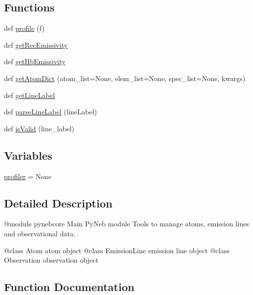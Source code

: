 \subsection*{Functions}
\begin{DoxyCompactItemize}
\item 
def \hyperlink{namespacepyneb_1_1core_1_1pynebcore_a2296b3a3cbab3cb017081eee855aa89a}{profile} (f)
\item 
def \hyperlink{namespacepyneb_1_1core_1_1pynebcore_aba9d4a5306330dd47f8a51455514c017}{get\+Rec\+Emissivity}
\item 
def \hyperlink{namespacepyneb_1_1core_1_1pynebcore_a027537ead17492a35c3e4e940cd95223}{get\+Hb\+Emissivity}
\item 
def \hyperlink{namespacepyneb_1_1core_1_1pynebcore_a4e1b2e2f554c7c9c0b76419a45b2ee59}{get\+Atom\+Dict} (atom\+\_\+list=None, elem\+\_\+list=None, spec\+\_\+list=None, kwargs)
\item 
def \hyperlink{namespacepyneb_1_1core_1_1pynebcore_a14c882fc308d727f77ed33c1f56212e4}{get\+Line\+Label}
\item 
def \hyperlink{namespacepyneb_1_1core_1_1pynebcore_a9fa8b0b7efdd4da21a816641bf17dcc7}{parse\+Line\+Label} (line\+Label)
\item 
def \hyperlink{namespacepyneb_1_1core_1_1pynebcore_a3bc988a0c3e90099888bef4e59f882b1}{is\+Valid} (line\+\_\+label)
\end{DoxyCompactItemize}
\subsection*{Variables}
\begin{DoxyCompactItemize}
\item 
\hyperlink{namespacepyneb_1_1core_1_1pynebcore_a5adecc87efd257b54198f2064493502a}{profiler} = None
\end{DoxyCompactItemize}


\subsection{Detailed Description}
\begin{DoxyVerb}@module pynebcore
Main PyNeb module
Tools to manage atoms, emission lines and observational data.

@class Atom           atom object
@class EmissionLine   emission line object
@class Observation    observation object\end{DoxyVerb}
 

\subsection{Function Documentation}
\hypertarget{namespacepyneb_1_1core_1_1pynebcore_a4e1b2e2f554c7c9c0b76419a45b2ee59}{}
